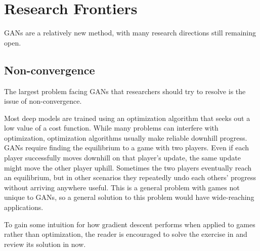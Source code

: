 \section{Research Frontiers}

GANs are a relatively new method, with many research directions still
remaining open.

\subsection{Non-convergence}

The largest problem facing GANs that researchers should try to resolve is the issue
of non-convergence.

Most deep models are trained using an optimization algorithm that seeks out a low
value of a cost function.
While many problems can interfere with optimization, optimization algorithms usually
make reliable downhill progress.
GANs require finding the equilibrium to a game with two players.
Even if each player successfully moves downhill on that player's update,
the same update might move the other player uphill.
Sometimes the two players eventually reach an equilibrium, but in other scenarios
they repeatedly undo each others' progress without arriving anywhere useful.
This is a general problem with games not unique to GANs, so a general solution
to this problem would have wide-reaching applications.

To gain some intuition for how gradient descent performs when applied to games
rather than optimization, the reader is encouraged to solve the exercise in
 and review its solution in  now.

